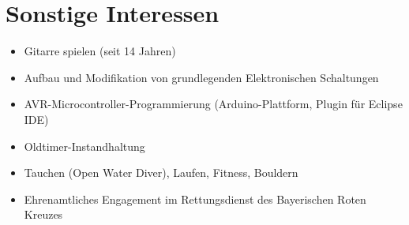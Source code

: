 

\section*{Sonstige Interessen}

\begin{itemize}
	\setlength{\itemsep}{0pt}
	\item Gitarre spielen (seit 14 Jahren)
	\item Aufbau und Modifikation von grundlegenden Elektronischen Schaltungen 
	\item AVR-Microcontroller-Programmierung (Arduino-Plattform, Plugin für Eclipse IDE)
	\item Oldtimer-Instandhaltung 
	\item Tauchen (Open Water Diver), Laufen, Fitness, Bouldern
	\item Ehrenamtliches Engagement im Rettungsdienst des Bayerischen Roten Kreuzes
\end{itemize}

